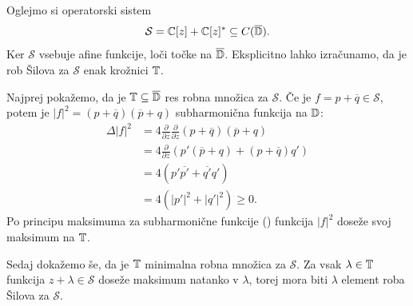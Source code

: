 \begin{zgled}\label{zgl:2.1}
    Oglejmo si operatorski sistem
    $$\mathcal{S} = \mathbb C[z] + \mathbb C[z]^* \subseteq C(\overline{\mathbb D}).$$
    Ker $\mathcal{S}$ vsebuje afine funkcije, loči točke na $\overline{\mathbb D}$.
    Eksplicitno lahko izračunamo, da je rob Šilova za $\mathcal{S}$
    enak krožnici $\mathbb T$.

    Najprej pokažemo, da je $\mathbb T \subseteq \overline{\mathbb D}$ res robna množica za $\mathcal{S}$.
    Če je $f = p + \overline{q} \in \mathcal{S}$,
    potem je $|f|^2 = (p + \overline{q})(\overline{p} + q)$ subharmonična funkcija na $\mathbb D$:
    \begin{align*}
        \Delta |f|^2 &= 4 \frac{\partial}{ \partial \overline{z}} \frac{\partial}{\partial z} (p + \overline{q})(\overline{p} + q)\\
        &= 4 \frac{\partial}{ \partial \overline{z}} \left(p' (\overline{p} + q) + (p + \overline{q}) q'\right)\\
        &= 4 (p' \overline{p'} + \overline{q'} q')\\
        &= 4 (|p'|^2 + |q'|^2) \geq 0.
    \end{align*}
    Po principu maksimuma za subharmonične funkcije (\cite[Theorem 2.3.1., str. 25]{ransford1995}) funkcija $|f|^2$ doseže svoj maksimum na $\mathbb T$.

    Sedaj dokažemo še, da je $\mathbb T$ minimalna robna množica za $\mathcal{S}$.
    Za vsak $\lambda \in \mathbb T$ funkcija $z + \lambda \in \mathcal{S}$ doseže maksimum natanko v $\lambda$,
    torej mora biti $\lambda$ element roba Šilova za $\mathcal{S}$.
\end{zgled}



